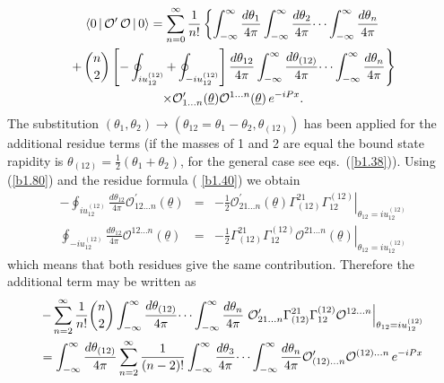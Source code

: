 \documentclass[a4paper,a4paper]{article}
\begin{document}
\begin{multline*}
\langle 0\,|\,\mathcal{O}^{\prime }\,\mathcal{O}\,|\,0\rangle
=\sum_{n=0}^{\infty }\frac{1}{n!}\left\{ \int_{-\infty }^{\infty }\frac{%
d\theta _{1}}{4\pi }\int_{-\infty }^{\infty }\frac{d\theta _{2}}{4\pi }\dots
\int_{-\infty }^{\infty }\frac{d\theta _{n}}{4\pi }\right. \\
\left. +\,\binom{n}{2}\left[
-\oint_{iu_{12}^{(12)}}+\oint_{-iu_{12}^{(12)}}\right] \frac{d\theta _{12}}{%
4\pi }\int_{-\infty }^{\infty }\frac{d\theta _{(12)}}{4\pi }\dots
\int_{-\infty }^{\infty }\frac{d\theta _{n}}{4\pi }\right\} \\
\times \mathcal{O}_{1\dots n}^{\prime }(\underline{\theta })\mathcal{O}%
^{1\dots n}(\underline{\theta })\,e^{-iPx}.
\end{multline*}
The substitution $(\theta _{1},\theta _{2})\rightarrow (\theta _{12}=\theta
_{1}-\theta _{2},\theta _{(12)})$ has been applied for the additional
residue terms (if the masses of 1 and 2 are equal the bound state rapidity
is $\theta _{(12)}=\frac{1}{2}(\theta _{1}+\theta _{2})$, for the general
case see eqs.~(\ref{b1.38})). Using (\ref{b1.80}) and the residue formula (%
\ref{b1.40}) we obtain 
\begin{eqnarray*}
-\oint_{iu_{12}^{(12)}}\frac{d\theta _{12}}{4\pi }\mathcal{O}_{12\dots
n}^{\prime }(\underline{\theta }) &=&-\frac{1}{2}\left. \mathcal{O}_{21\dots
n}^{\prime }(\underline{\theta })\Gamma _{(12)}^{21}\Gamma
_{12}^{(12)}\right| _{\theta _{12}=iu_{12}^{(12)}} \\
\oint_{-iu_{12}^{(12)}}\frac{d\theta _{12}}{4\pi }\mathcal{O}^{12\dots n}(%
\underline{\theta }) &=&-\frac{1}{2}\left. \Gamma _{(12)}^{21}\Gamma
_{12}^{(12)}\mathcal{O}^{21\dots n}(\underline{\theta })\right| _{\theta
_{12}=iu_{12}^{(12)}}
\end{eqnarray*}
which means that both residues give the same contribution. Therefore the
additional term may be written as 
\begin{multline*}
-\sum_{n=2}^{\infty }\frac{1}{n!}\binom{n}{2}\int_{-\infty }^{\infty }\frac{%
d\theta _{(12)}}{4\pi }\dots \int_{-\infty }^{\infty }\frac{d\theta _{n}}{%
4\pi }\left. \mathcal{O}_{21\dots n}^{\prime }\Gamma _{(12)}^{21}\Gamma
_{12}^{(12)}\mathcal{O}^{12\dots n}\right| _{\theta _{12}=iu_{12}^{(12)}} \\
=\int_{-\infty }^{\infty }\frac{d\theta _{(12)}}{4\pi }\sum_{n=2}^{\infty }%
\frac{1}{(n-2)!}\int_{-\infty }^{\infty }\frac{d\theta _{3}}{4\pi }\dots
\int_{-\infty }^{\infty }\frac{d\theta _{n}}{4\pi }\mathcal{O}_{(12)\dots
n}^{\prime }\mathcal{O}^{(12)\dots n}\,e^{-iPx}
\end{multline*}
\end{document}
